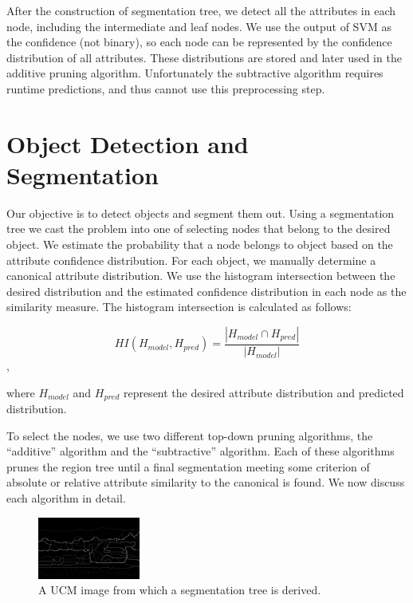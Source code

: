 \documentclass[10pt,twocolumn,letterpaper]{article}
\begin{document}
After the construction of segmentation tree, we detect all
the attributes in each node, including the intermediate and
leaf nodes. We use the output of SVM as the confidence (not binary),
so each node can be represented by the confidence distribution of
all attributes.  These distributions are stored and later used in
the additive pruning algorithm.  Unfortunately the subtractive algorithm
requires runtime predictions, and thus cannot use this preprocessing
step.



\section{Object Detection and Segmentation}
\label{sec:detection}

Our objective is to detect objects and segment them out. Using a segmentation tree
we cast the problem into one of selecting nodes that belong 
to the desired object. We estimate the
probability that a node belongs to object based on the attribute
confidence distribution. For each object, we manually determine a
canonical attribute distribution.  We use the
histogram intersection between the desired distribution and the
estimated confidence distribution in each node as the similarity
measure. The histogram intersection is calculated as follows:

\[ HI(H_{model},H_{pred}) = \frac{|H_{model} \cap H_{pred}|}{|H_{model}|}
\] ,

where $H_{model}$ and $H_{pred}$ represent the desired attribute
distribution and predicted distribution.

To select the nodes, we use two different top-down pruning algorithms, 
the ``additive'' algorithm and the ``subtractive'' algorithm. 
Each of these algorithms prunes the region tree until a final segmentation
meeting some criterion of absolute or relative attribute similarity to the canonical is found.
We now discuss each algorithm in detail.

\begin{figure}
\centering
\includegraphics[width=0.30\textwidth]{figures/2008_000052_ucm.bmp.eps}
\caption{A UCM image from which a segmentation tree is derived.}
\label{fig:ucm}
\end{figure}
\end{document}

